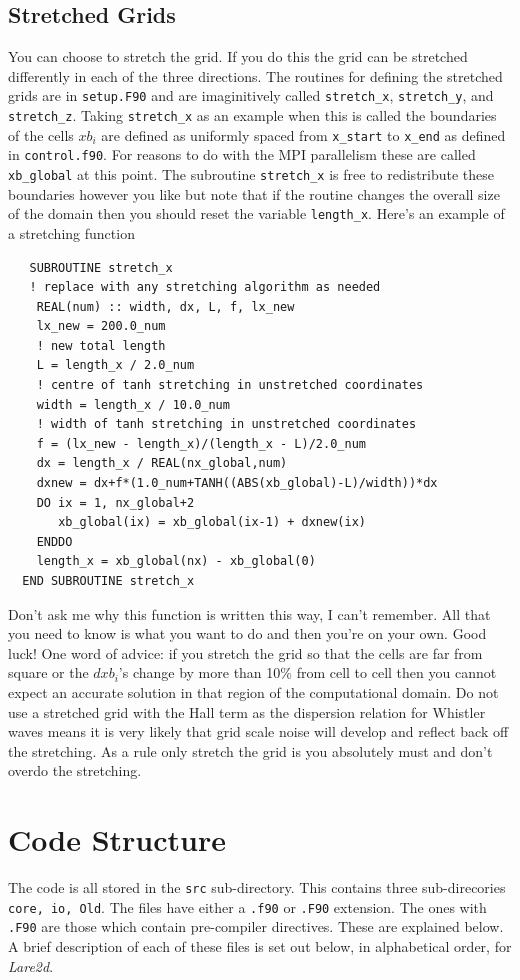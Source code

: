 \documentclass[11pt]{article}
\begin{document}
\subsection{Stretched Grids}
You can choose to stretch the grid. If you do this the grid can be stretched differently in each of the three directions. The routines for defining the stretched grids are in \texttt{setup.F90} and are imaginitively called \texttt{stretch\_x}, \texttt{stretch\_y}, and \texttt{stretch\_z}. Taking \texttt{stretch\_x} as an example when this is called the boundaries of the cells 
$xb_i$ are defined as uniformly spaced from \texttt{x\_start} to \texttt{x\_end} as defined in \texttt{control.f90}. For reasons to do with the MPI parallelism these are called \texttt{xb\_global} at this point. The subroutine \texttt{stretch\_x} is free to redistribute these boundaries however you like but note that if the routine changes the overall size of the domain then you should reset the variable \texttt{length\_x}. Here's an example of a stretching function 
\begin{verbatim}
   SUBROUTINE stretch_x   
   ! replace with any stretching algorithm as needed
    REAL(num) :: width, dx, L, f, lx_new
    lx_new = 200.0_num                
    ! new total length
    L = length_x / 2.0_num       
    ! centre of tanh stretching in unstretched coordinates
    width = length_x / 10.0_num       
    ! width of tanh stretching in unstretched coordinates
    f = (lx_new - length_x)/(length_x - L)/2.0_num
    dx = length_x / REAL(nx_global,num)  
    dxnew = dx+f*(1.0_num+TANH((ABS(xb_global)-L)/width))*dx
    DO ix = 1, nx_global+2
       xb_global(ix) = xb_global(ix-1) + dxnew(ix)
    ENDDO
    length_x = xb_global(nx) - xb_global(0)
  END SUBROUTINE stretch_x
\end{verbatim}
Don't ask me why this function is written this way, I can't remember. All that you need to know is what you want to do and then you're on your own. Good luck! One word of advice: if you stretch the grid so that the cells are far from square or the $dxb_i$'s change by more than 10\% from cell to cell then you cannot expect an accurate solution in that region of the computational domain. Do not use a stretched grid with the Hall term as the dispersion relation for Whistler waves means it is very likely that grid scale noise will develop and reflect back off the stretching. As a rule only stretch the grid is you absolutely must and don't overdo the stretching.

\section{Code Structure}
The code is all stored in the \texttt{src} sub-directory. This contains three sub-direcories \texttt{core, io, Old}. The files have either a \texttt{.f90} or \texttt{.F90} extension. The ones with \texttt{.F90} are those which contain pre-compiler directives. These are explained below. A brief description of each of these files is set out below, in alphabetical order, for {\it Lare2d}. 
\end{document}
